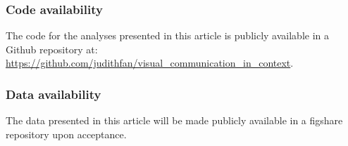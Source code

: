 \documentclass[9pt,twocolumn,twoside]{pnas-new}
\begin{document}
{\subsubsection*{Code availability} The code for the analyses presented in this article is publicly available in a Github repository at: \url{https://github.com/judithfan/visual_communication_in_context}.

\subsubsection*{Data availability} The data presented in this article will be made publicly available in a figshare repository upon acceptance.

}

\showmatmethods %


\showacknow{} %



\end{document}

